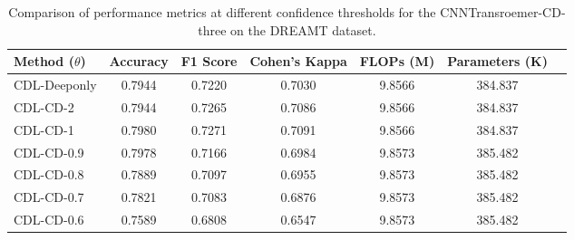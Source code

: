 \begin{table}[ht]
    \centering
    \begin{tabular}{lcccccc}
        \toprule
        Method (\(\theta\)) & Accuracy & F1 Score & Cohen's Kappa & FLOPs (M) & Parameters (K) \\
        \midrule
        CDL-Deeponly & 0.7944 & 0.7220 & 0.7030 & 9.8566 & 384.837\\
        CDL-CD-2 & 0.7944 & 0.7265 & 0.7086 & 9.8566 & 384.837\\
        CDL-CD-1 & 0.7980 & 0.7271 & 0.7091 & 9.8566 & 384.837\\
        CDL-CD-0.9 & 0.7978 & 0.7166 & 0.6984 & 9.8573 & 385.482 \\
        CDL-CD-0.8 & 0.7889 & 0.7097 & 0.6955 & 9.8573 & 385.482 \\
        CDL-CD-0.7 & 0.7821 & 0.7083 & 0.6876 & 9.8573 & 385.482 \\
        CDL-CD-0.6 & 0.7589 & 0.6808 & 0.6547 & 9.8573 & 385.482 \\
        \bottomrule
    \end{tabular}
    \caption{Comparison of performance metrics at different confidence thresholds for the CNNTransroemer-CD-three on the DREAMT dataset.}
    \label{tab:performance_of_different_confidence}
\end{table}